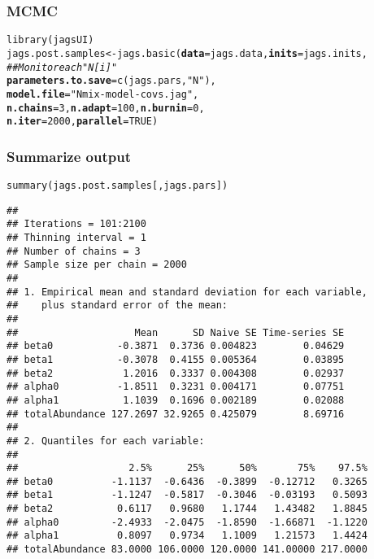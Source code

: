 \documentclass[color=usenames,dvipsnames]{beamer}\usepackage[]{graphicx}\usepackage[]{xcolor}
\makeatletter
\newcommand{\hlnum}[1]{\textcolor[rgb]{0.69,0.494,0}{#1}}%
\newcommand{\hlsng}[1]{\textcolor[rgb]{0.749,0.012,0.012}{#1}}%
\newcommand{\hlcom}[1]{\textcolor[rgb]{0.514,0.506,0.514}{\textit{#1}}}%
\newcommand{\hldef}[1]{\textcolor[rgb]{0,0,0}{#1}}%
\newcommand{\hlkwb}[1]{\textcolor[rgb]{0,0.341,0.682}{#1}}%
\newcommand{\hlkwc}[1]{\textcolor[rgb]{0,0,0}{\textbf{#1}}}%
\newcommand{\hlkwd}[1]{\textcolor[rgb]{0.004,0.004,0.506}{#1}}%
\newenvironment{kframe}{%
 \def\at@end@of@kframe{}%
 \ifinner\ifhmode%
  \def\at@end@of@kframe{\end{minipage}}%
  \begin{minipage}{\columnwidth}%
 \fi\fi%
 \def\FrameCommand##1{\hskip\@totalleftmargin \hskip-\fboxsep
 \colorbox{shadecolor}{##1}\hskip-\fboxsep
     \hskip-\linewidth \hskip-\@totalleftmargin \hskip\columnwidth}%
 \MakeFramed {\advance\hsize-\width
   \@totalleftmargin\z@ \linewidth\hsize
   \@setminipage}}%
 {\par\unskip\endMakeFramed%
 \at@end@of@kframe}
\newenvironment{knitrout}{}{} %
\makeatother
\begin{document}
\begin{frame}[fragile]
  \frametitle{MCMC}
  \small
\begin{knitrout}\scriptsize
{}\color{fgcolor}\begin{kframe}
\begin{alltt}
\hlkwd{library}\hldef{(jagsUI)}
\hldef{jags.post.samples} \hlkwb{<-} \hlkwd{jags.basic}\hldef{(}\hlkwc{data}\hldef{=jags.data,} \hlkwc{inits}\hldef{=jags.inits,}
                                \hlcom{## Monitor each "N[i]" }
                                \hlkwc{parameters.to.save}\hldef{=}\hlkwd{c}\hldef{(jags.pars,} \hlsng{"N"}\hldef{),}
                                \hlkwc{model.file}\hldef{=}\hlsng{"Nmix-model-covs.jag"}\hldef{,}
                                \hlkwc{n.chains}\hldef{=}\hlnum{3}\hldef{,} \hlkwc{n.adapt}\hldef{=}\hlnum{100}\hldef{,} \hlkwc{n.burnin}\hldef{=}\hlnum{0}\hldef{,}
                                \hlkwc{n.iter}\hldef{=}\hlnum{2000}\hldef{,} \hlkwc{parallel}\hldef{=}\hlnum{TRUE}\hldef{)}
\end{alltt}
\end{kframe}
\end{knitrout}
\end{frame}



\begin{frame}[fragile]
  \frametitle{Summarize output}
\begin{knitrout}\tiny
{}\color{fgcolor}\begin{kframe}
\begin{alltt}
\hlkwd{summary}\hldef{(jags.post.samples[,jags.pars])}
\end{alltt}
\begin{verbatim}
## 
## Iterations = 101:2100
## Thinning interval = 1 
## Number of chains = 3 
## Sample size per chain = 2000 
## 
## 1. Empirical mean and standard deviation for each variable,
##    plus standard error of the mean:
## 
##                    Mean      SD Naive SE Time-series SE
## beta0           -0.3871  0.3736 0.004823        0.04629
## beta1           -0.3078  0.4155 0.005364        0.03895
## beta2            1.2016  0.3337 0.004308        0.02937
## alpha0          -1.8511  0.3231 0.004171        0.07751
## alpha1           1.1039  0.1696 0.002189        0.02088
## totalAbundance 127.2697 32.9265 0.425079        8.69716
## 
## 2. Quantiles for each variable:
## 
##                   2.5%      25%      50%       75%    97.5%
## beta0          -1.1137  -0.6436  -0.3899  -0.12712   0.3265
## beta1          -1.1247  -0.5817  -0.3046  -0.03193   0.5093
## beta2           0.6117   0.9680   1.1744   1.43482   1.8845
## alpha0         -2.4933  -2.0475  -1.8590  -1.66871  -1.1220
## alpha1          0.8097   0.9734   1.1009   1.21573   1.4424
## totalAbundance 83.0000 106.0000 120.0000 141.00000 217.0000
\end{verbatim}
\end{kframe}
\end{knitrout}
\end{frame}
\end{document}
